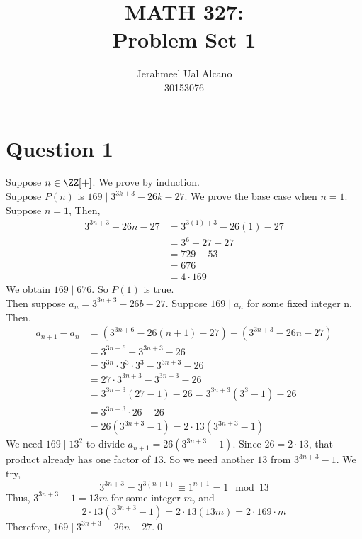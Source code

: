 \documentclass{report}
\title{MATH 327: \\ Problem Set 1}
\author{Jerahmeel Ual Alcano \\ 30153076}
\date{}
\begin{document}
\section*{Question 1}
Suppose \(n \in \ZZ[+]\). We prove by induction.\\
Suppose \(P(n)\) is \(169 \mid 3^{3k+3} - 26k -27\). We prove the base case
when \(n=1\). Suppose \(n=1\), Then,
\begin{align*}
    3^{3n +3} -26n -27 & = 3^{3(1) +3} -26(1) -27 \\
                       & =3^6 - 27 -27            \\
                       & =729 -53                 \\
                       & =676                     \\
                       & = 4 \cdot 169
\end{align*}
We obtain \(169 \mid 676\). So \(P(1)\) is true.
\\[0.25cm]
Then suppose \(a_n = 3^{3n+3}-26b-27\). Suppose \(169 \mid a_n\) for some
fixed integer n. Then,
\begin{align*}
    a_{n+1} - a_n & = (3^{3n + 6} - 26(n+1) - 27 ) - (3^{3n +3} -26n -27) \\
                  & = 3^{3n + 6} - 3^{3n+3} -26                           \\
                  & = 3^{3n}\cdot 3^3 \cdot 3^3 - 3^{3n +3} - 26          \\
                  & = 27 \cdot 3^{3n +3} - 3^{3n + 3} -26                 \\
                  & = 3^{3n + 3}(27 -1) - 26 = 3^{3n + 3}(3^3 -1) - 26    \\
                  & = 3^{3n + 3}\cdot26 - 26                              \\
                  & = 26(3^{3n + 3}-1) = 2\cdot13(3^{3n + 3} -1)
\end{align*}
We need \(169 \mid 13^2\) to divide \(a_{n+1} = 26(3^{3n + 3} -1)\). Since
\(26 = 2\cdot 13\), that product already has one factor of \(13\).
So we need another \(13\) from \(3^{3n + 3} -1\). We try,
\[3^{3n + 3} = 3^{3(n+1)} \equiv 1^{n+1} =1 \mod13\]
Thus, \(3^{3n + 3} -1 = 13m \) for some integer \(m\), and
\[2\cdot13 (3^{3n + 3} -1) = 2\cdot13(13m) = 2\cdot 169 \cdot m\]
Therefore, \(169 \mid 3^{3n + 3}-26n-27\).\qed
\end{document}
